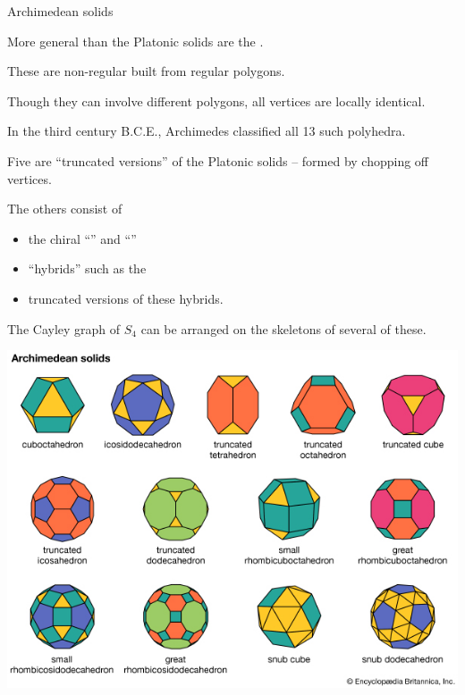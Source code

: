 \documentclass[8pt, handout]{beamer}
\newcommand{\Pause}{}
\begin{document}
\begin{frame}{Archimedean solids} %
  
  More general than the Platonic solids are the . \bigskip\Pause

  These are non-regular  built from
  regular polygons.

  \bigskip\Pause
  
  Though they can involve different polygons, all vertices are
  locally identical.

  \bigskip\Pause

  In the third century B.C.E., Archimedes classified all 13 such polyhedra.
  
  \bigskip\Pause

  Five are ``truncated versions'' of the Platonic solids -- formed
  by chopping off vertices.

  \bigskip\Pause

  The others consist of \smallskip
  \begin{itemize}
  \item the chiral ``'' and ``'' \smallskip\Pause
  \item ``hybrids'' such as the  \smallskip\Pause
  \item truncated versions of these hybrids.
  \end{itemize}
  
  \bigskip\Pause
  
  The Cayley graph of $S_4$ can be arranged on the skeletons of
  several of these. 
    
\end{frame}


\begin{frame}%

  \begin{center}
    \includegraphics[width=1\textwidth]{archimedean-solids.jpg}
  \end{center}
  
\end{frame}
\end{document}
